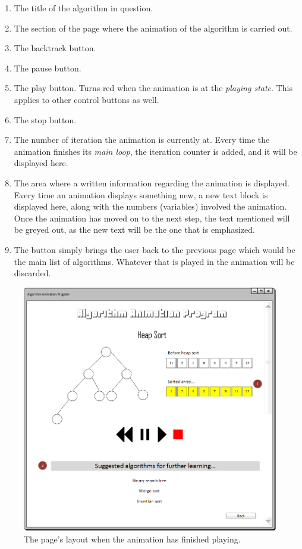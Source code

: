 \begin{enumerate}
\item The title of the algorithm in question.
\item The section of the page where the animation of the algorithm is carried out.
\item The backtrack button.
\item The pause button.
\item The play button. Turns red when the animation is at the \textit{playing state}. This applies to other control buttons as well.
\item The stop button.
\item The number of iteration the animation is currently at. Every time the animation finishes its \textit{main loop}, the iteration counter is added, and it will be displayed here.
\item The area where a written information regarding the animation is displayed. Every time an animation displays something new, a new text block is displayed here, along with the numbers (variables) involved the animation. Once the animation has moved on to the next step, the text mentioned will be greyed out, as the new text will be the one that is emphasized. 
\item The button simply brings the user back to the previous page which would be the main list of algorithms. Whatever that is played in the animation will be discarded.
\end{enumerate}

\newpage

\begin{figure}[H]
\centering
\hspace*{-0.5cm}
\includegraphics[scale=0.8]{images/report_images/uiAnimationDone.png}
\caption{The page's layout when the animation has finished playing.}
\label{uiAnimationDone}
\end{figure}

